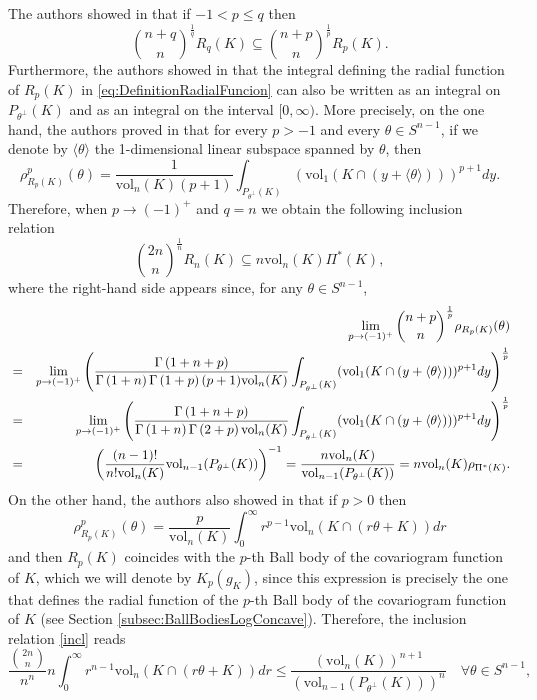 \documentclass[10pt]{amsart}
\def\vol{\mathrm{vol}}
\numberwithin{equation}{section}
\begin{document}
The authors showed in \cite[Theorem 5.5]{GZ} that if $-1<p\leq q$ then
\begin{equation}\label{eq:Inclusionpq}
{{n+q}\choose{n}}^\frac{1}{q}R_q(K)\subseteq{{n+p}\choose{n}}^\frac{1}{p}R_p(K).
\end{equation}
Furthermore, the authors showed in \cite[Lemma 2.1, Lemma 3.1]{GZ} that the integral defining the radial function of $R_p(K)$ in \eqref{eq:DefinitionRadialFuncion} can also be written as an integral on $P_{\theta^\perp}(K)$ and as an integral on the interval $[0,\infty)$. More precisely, on the one hand, the authors proved in \cite[Lemma 2.1]{GZ} that for every $p>-1$ and every $\theta\in S^{n-1}$, if we denote by $\langle\theta\rangle$ the 1-dimensional linear subspace spanned by $\theta$, then
$$
\rho_{R_p(K)}^p(\theta)=\frac{1}{\vol_n(K)(p+1)}\int_{P_{\theta^\perp}(K)}(\vol_1(K\cap(y+\langle\theta\rangle)))^{p+1}dy.
$$
Therefore, when $p\to(-1)^+$ and $q=n$ we obtain the following inclusion relation
\begin{equation}\label{incl}
{{2n}\choose{n}}^\frac{1}{n}R_n(K)\subseteq n\vol_n(K)\Pi^*(K),
\end{equation}
where the right-hand side appears since, for any $\theta\in S^{n-1}$,
\begin{eqnarray*}
&&\lim_{p\to(-1)^+}{{n+p}\choose{n}}^\frac{1}{p}\rho_{R_p(K)}(\theta)\cr
&=&\lim_{p\to(-1)^+}\left(\frac{\Gamma\left(1+n+p\right)}{\Gamma\left(1+n\right)\Gamma\left(1+p\right)(p+1)\vol_n(K)}\int_{P_{\theta^\perp}(K)}(\vol_1(K\cap(y+\langle\theta\rangle)))^{p+1}dy\right)^\frac{1}{p}\cr
&=&\lim_{p\to(-1)^+}\left(\frac{\Gamma\left(1+n+p\right)}{\Gamma\left(1+n\right)\Gamma\left(2+p\right)\vol_n(K)}\int_{P_{\theta^\perp}(K)}(\vol_1(K\cap(y+\langle\theta\rangle)))^{p+1}dy\right)^\frac{1}{p}\cr
&=&\left(\frac{(n-1)!}{n!\vol_n(K)}\vol_{n-1}(P_{\theta^\perp}(K))\right)^{-1}=\frac{n\vol_n(K)}{\vol_{n-1}(P_{\theta^\perp}(K))}=n\vol_n(K)\rho_{\Pi^*(K)}.\cr
\end{eqnarray*}
On the other hand, the authors also showed in \cite[Lemma 3.1]{GZ} that if $p>0$ then
$$
\rho_{R_p(K)}^p(\theta)=\frac{p}{\vol_n(K)}\int_0^{\infty}r^{p-1}\vol_n(K\cap(r\theta+K))dr
$$
and then $R_p(K)$ coincides with the $p$-th Ball body of the covariogram function of $K$, which we will denote by $K_p(g_K)$, since this expression is precisely the one that defines the radial function of the $p$-th Ball body of the covariogram function of $K$ (see Section \ref{subsec:BallBodiesLogConcave}). Therefore, the inclusion relation \eqref{incl} reads
\begin{equation}\label{inclusion2}
\frac{{{2n}\choose{n}}}{n^n}n\int_0^\infty r^{n-1}\vol_n(K\cap(r\theta+K))dr\leq\frac{(\vol_n(K))^{n+1}}{(\vol_{n-1}(P_{\theta^\perp}(K)))^n}\quad\forall\theta\in S^{n-1},
\end{equation}
\end{document}

